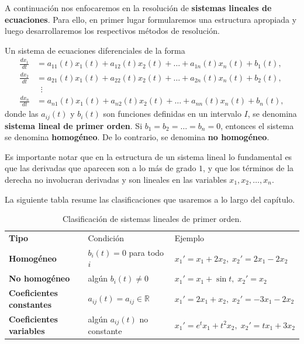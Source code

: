 
A continuaci\'on nos enfocaremos en la resoluci\'on de \textbf{sistemas lineales de ecuaciones}. Para ello, en primer lugar formularemos una estructura apropiada y luego desarrollaremos los respectivos m\'etodos de resoluci\'on.

\begin{definition}
Un sistema de ecuaciones diferenciales de la forma
\begin{equation}\label{eq:sistema-general}
\begin{aligned}
\frac{dx_1}{dt} &= a_{11}(t)x_1(t) + a_{12}(t)x_2(t) + \dots + a_{1n}(t)x_n(t) + b_1(t), \\
\frac{dx_2}{dt} &= a_{21}(t)x_1(t) + a_{22}(t)x_2(t) + \dots + a_{2n}(t)x_n(t) + b_2(t), \\
&\;\;\vdots \\
\frac{dx_n}{dt} &= a_{n1}(t)x_1(t) + a_{n2}(t)x_2(t) + \dots + a_{nn}(t)x_n(t) + b_n(t),
\end{aligned}
\end{equation}
donde las $a_{ij}(t)$ y $b_i(t)$ son funciones definidas en un intervalo $I$, se denomina \textbf{sistema lineal de primer orden}. Si $b_1 = b_2 = \dots = b_n = 0$, entonces el sistema se denomina \textbf{homog\'eneo}. De lo contrario, se denomina \textbf{no homog\'eneo}.
\end{definition}

\begin{remark}
Es importante notar que en la estructura de un sistema lineal lo fundamental es que las derivadas que aparecen son a lo m\'as de grado $1$, y que los t\'erminos de la derecha no involucran derivadas y son lineales en las variables $x_1,x_2,\dots,x_n$.
\end{remark}

La siguiente tabla resume las clasificaciones que usaremos a lo largo del cap\'itulo.

\begin{table}[H]
\centering
\renewcommand{\arraystretch}{1.3}
\begin{tabular}{>{\bfseries}l l l}
\rowcolor{bbe!15}
\textcolor{bbe}{Tipo} & \textcolor{bbe}{Condici\'on} & \textcolor{bbe}{Ejemplo} \\
Homog\'eneo & $b_i(t)=0$ para todo $i$ & $x_1'=x_1+2x_2,\; x_2'=2x_1-2x_2$ \\
No homog\'eneo & alg\'un $b_i(t)\neq 0$ & $x_1'=x_1+\sin t,\; x_2'=x_2$ \\
Coeficientes constantes & $a_{ij}(t)=a_{ij}\in\mathbb R$ & $x_1'=2x_1+x_2,\; x_2'=-3x_1-2x_2$ \\
Coeficientes variables & alg\'un $a_{ij}(t)$ no constante & $x_1'=e^tx_1+t^2x_2,\; x_2'=tx_1+3x_2$ \\
\end{tabular}
\caption{Clasificaci\'on de sistemas lineales de primer orden.}
\end{table}

